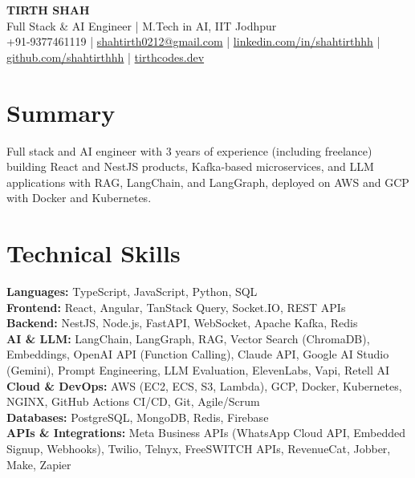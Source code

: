 \documentclass[a4paper,10pt]{article}
\begin{document}
\begin{center}
  {\LARGE \textbf{TIRTH SHAH}}\\[3pt]
  Full Stack \& AI Engineer | M.Tech in AI, IIT Jodhpur\\[3pt]
  +91-9377461119 | \href{mailto:shahtirth0212@gmail.com}{shahtirth0212@gmail.com} |
  \href{https://linkedin.com/in/shahtirthhh}{linkedin.com/in/shahtirthhh} |
  \href{https://github.com/shahtirthhh}{github.com/shahtirthhh} |
  \href{https://tirthcodes.dev}{tirthcodes.dev}
\end{center}

\section{Summary}
Full stack and AI engineer with 3 years of experience (including freelance) building React and NestJS products, Kafka-based microservices, and LLM applications with RAG, LangChain, and LangGraph, deployed on AWS and GCP with Docker and Kubernetes.

\section{Technical Skills}
\textbf{Languages:} TypeScript, JavaScript, Python, SQL\\
\textbf{Frontend:} React, Angular, TanStack Query, Socket.IO, REST APIs\\
\textbf{Backend:} NestJS, Node.js, FastAPI, WebSocket, Apache Kafka, Redis\\
\textbf{AI \& LLM:} LangChain, LangGraph, RAG, Vector Search (ChromaDB), Embeddings, OpenAI API (Function Calling), Claude API, Google AI Studio (Gemini), Prompt Engineering, LLM Evaluation, ElevenLabs, Vapi, Retell AI\\
\textbf{Cloud \& DevOps:} AWS (EC2, ECS, S3, Lambda), GCP, Docker, Kubernetes, NGINX, GitHub Actions CI/CD, Git, Agile/Scrum\\
\textbf{Databases:} PostgreSQL, MongoDB, Redis, Firebase\\
\textbf{APIs \& Integrations:} Meta Business APIs (WhatsApp Cloud API, Embedded Signup, Webhooks), Twilio, Telnyx, FreeSWITCH APIs, RevenueCat, Jobber, Make, Zapier

\end{document}
